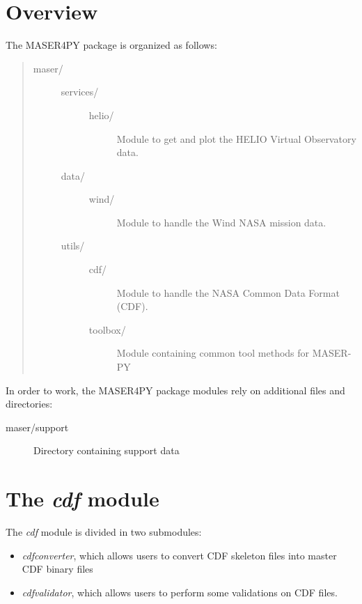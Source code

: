 \documentclass[letterpaper,10pt,english]{sphinxmanual}
\begin{document}
\chapter{Overview}
\label{intro:overview}
The MASER4PY package is organized as follows:
\begin{quote}
\begin{description}
\item[{maser/}] \leavevmode\begin{description}
\item[{services/}] \leavevmode\begin{description}
\item[{helio/}] \leavevmode
Module to get and plot the HELIO Virtual Observatory data.

\end{description}

\item[{data/}] \leavevmode\begin{description}
\item[{wind/}] \leavevmode
Module to handle the Wind NASA mission data.

\end{description}

\item[{utils/}] \leavevmode\begin{description}
\item[{cdf/}] \leavevmode
Module to handle the NASA Common Data Format (CDF).

\item[{toolbox/}] \leavevmode
Module containing common tool methods for MASER-PY

\end{description}

\end{description}

\end{description}
\end{quote}

In order to work, the MASER4PY package modules rely on additional files and directories:
\begin{description}
\item[{maser/support}] \leavevmode
Directory containing support data

\end{description}


\chapter{The \emph{cdf} module}
\label{cdf::doc}\label{cdf:the-cdf-module}
The \emph{cdf} module is divided in two submodules:
\begin{itemize}
\item {} 
\emph{cdfconverter}, which allows users to convert CDF skeleton files into master CDF binary files

\item {} 
\emph{cdfvalidator}, which allows users to perform some validations on CDF files.

\end{itemize}
\end{document}
